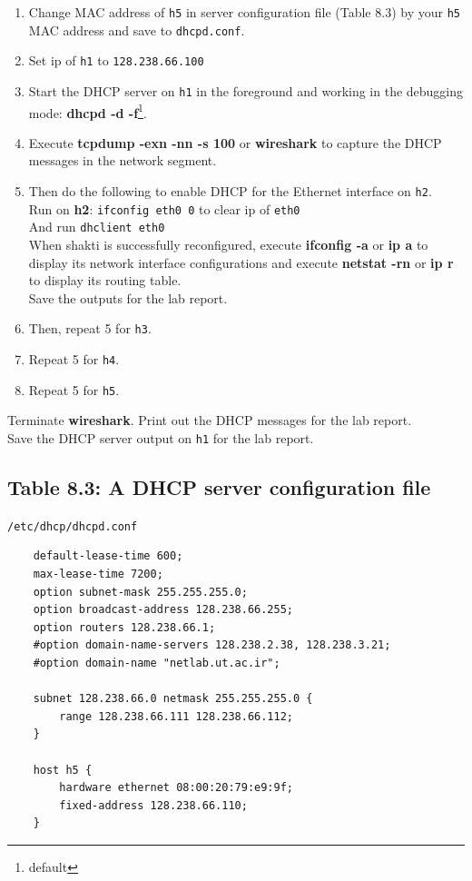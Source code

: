 \documentclass[10pt,a4paper]{article}
\numberwithin{equation}{section}
\numberwithin{figure}{section}
\numberwithin{table}{section}
\begin{document}
    \begin{enumerate}
        \item Change MAC address of \texttt{h5} in server configuration file (Table 8.3) by your \texttt{h5} MAC address and save to \texttt{dhcpd.conf}.
        \item Set ip of \texttt{h1} to \texttt{128.238.66.100}
        \item Start the DHCP server on \texttt{h1} in the foreground and working in the debugging mode: \textbf{dhcpd -d -f}\footnote{default }.
        \item Execute \textbf{tcpdump -exn -nn -s 100} or \textbf{wireshark} to capture the DHCP messages in the network segment.
        \item Then do the following to enable DHCP for the Ethernet interface on \texttt{h2}. \\
        Run on \textbf{h2}: \texttt{ifconfig eth0 0} to clear ip of \texttt{eth0}\\
        And run \texttt{dhclient eth0}\\
        When shakti is successfully reconfigured, execute \textbf{ifconfig -a} or \textbf{ip a} to display its
        network interface configurations and execute \textbf{netstat -rn} or \textbf{ip r} to display its routing table.\\
        Save the outputs for the lab report.
        \item Then, repeat 5 for \texttt{h3}.
        \item Repeat 5 for \texttt{h4}.
        \item Repeat 5 for \texttt{h5}.
    \end{enumerate}
    Terminate \textbf{wireshark}. Print out the DHCP messages for the lab report. \\
    Save the DHCP server output on \texttt{h1} for the lab report.

    \subsection*{Table 8.3: A DHCP server configuration file}
    \texttt{/etc/dhcp/dhcpd.conf}
    \begin{verbatim}
    default-lease-time 600;
    max-lease-time 7200;
    option subnet-mask 255.255.255.0;
    option broadcast-address 128.238.66.255;
    option routers 128.238.66.1;
    #option domain-name-servers 128.238.2.38, 128.238.3.21;
    #option domain-name "netlab.ut.ac.ir";

    subnet 128.238.66.0 netmask 255.255.255.0 {
        range 128.238.66.111 128.238.66.112;
    }

    host h5 {
        hardware ethernet 08:00:20:79:e9:9f;
        fixed-address 128.238.66.110;
    }
    \end{verbatim}
\end{document}
